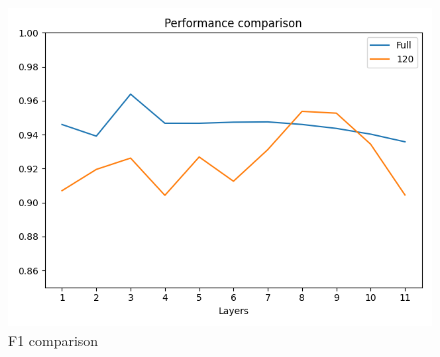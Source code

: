 \documentclass[11pt,a4paper]{article}
\begin{document}
\begin{figure}
\begin{center}
  \includegraphics[width=\linewidth]{f1-comp.png}
  \caption{\label{fig:f1-comp}F1 comparison}
\end{center}
\end{figure}
\end{document}
